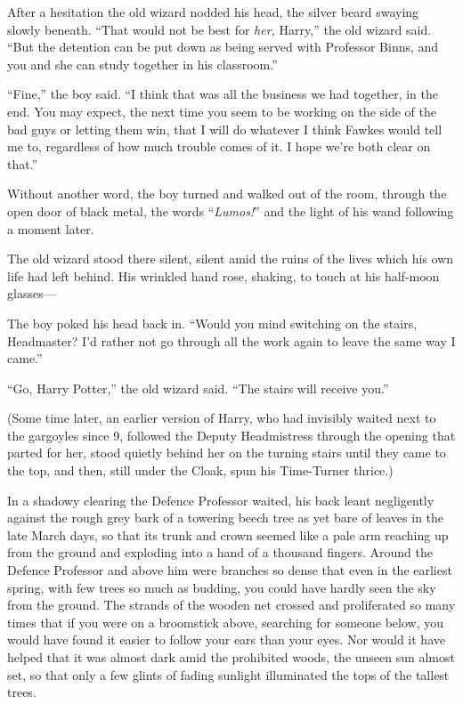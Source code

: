 After a hesitation the old wizard nodded his head, the silver beard swaying
slowly beneath. “That would not be best for \emph{her,} Harry,” the old wizard
said. “But the detention can be put down as being served with Professor Binns,
and you and she can study together in his classroom.”

“Fine,” the boy said. “I think that was all the business we had together, in
the end. You may expect, the next time you seem to be working on the side of
the bad guys or letting them win, that I will do whatever I think Fawkes would
tell me to, regardless of how much trouble comes of it. I hope we’re both clear
on that.”

Without another word, the boy turned and walked out of the room, through the
open door of black metal, the words “\emph{Lumos!}” and the light of his wand
following a moment later.

The old wizard stood there silent, silent amid the ruins of the lives which his
own life had left behind. His wrinkled hand rose, shaking, to touch at his
half-moon glasses—

The boy poked his head back in. “Would you mind switching on the stairs,
Headmaster? I’d rather not go through all the work again to leave the same way
I came.”

“Go, Harry Potter,” the old wizard said. “The stairs will receive you.”

(Some time later, an earlier version of Harry, who had invisibly waited next to
the gargoyles since 9\PM, followed the Deputy Headmistress through the opening
that parted for her, stood quietly behind her on the turning stairs until they
came to the top, and then, still under the Cloak, spun his Time-Turner thrice.)

In a shadowy clearing the Defence Professor waited, his back leant negligently
against the rough grey bark of a towering beech tree as yet bare of leaves in the
late March days, so that its trunk and crown seemed like a pale arm reaching up
from the ground and exploding into a hand of a thousand fingers. Around the
Defence Professor and above him were branches so dense that even in the
earliest spring, with few trees so much as budding, you could have hardly seen
the sky from the ground. The strands of the wooden net crossed and proliferated
so many times that if you were on a broomstick above, searching for someone
below, you would have found it easier to follow your ears than your eyes. Nor
would it have helped that it was almost dark amid the prohibited woods, the
unseen sun almost set, so that only a few glints of fading sunlight illuminated
the tops of the tallest trees.

